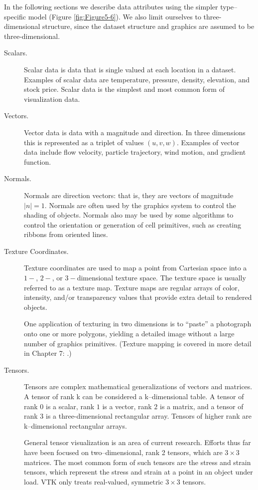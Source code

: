 In the following sections we describe data attributes using the simpler type--specific model (Figure \ref{fig:Figure5-6}). We also limit ourselves to three-dimensional structure, since the dataset structure and graphics are assumed to be three-dimensional.

\begin{description}

\item[Scalars.] Scalar data is data that is single valued at each location in a dataset. Examples of scalar data are temperature, pressure, density, elevation, and stock price. Scalar data is the simplest and most common form of visualization data.

\item[Vectors.] Vector data is data with a magnitude and direction. In three dimensions this is represented as a triplet of values $(u, v, w)$. Examples of vector data include flow velocity, particle trajectory, wind motion, and gradient function.

\item[Normals.] Normals are direction vectors: that is, they are vectors of magnitude $|n|=1$. Normals are often used by the graphics system to control the shading of objects. Normals also may be used by some algorithms to control the orientation or generation of cell primitives, such as creating ribbons from oriented lines.

\item[Texture Coordinates.] Texture coordinates are used to map a point from Cartesian space into a $1-$, $2-$, or $3-$dimensional texture space. The texture space is usually referred to as a texture map. Texture maps are regular arrays of color, intensity, and/or transparency values that provide extra detail to rendered objects.

One application of texturing in two dimensions is to ``paste'' a photograph onto one or more polygons, yielding a detailed image without a large number of graphics primitives. (Texture mapping is covered in more detail in Chapter 7:  .)

\item[Tensors.] Tensors are complex mathematical generalizations of vectors and matrices. A tensor of rank k can be considered a k--dimensional table. A tensor of rank $0$ is a scalar, rank $1$ is a vector, rank $2$ is a matrix, and a tensor of rank $3$ is a three-dimensional rectangular array. Tensors of higher rank are k--dimensional rectangular arrays.

General tensor visualization is an area of current research. Efforts thus far have been focused on two--dimensional, rank 2 tensors, which are $3 \times 3$ matrices. The most common form of such tensors are the stress and strain tensors, which represent the stress and strain at a point in an object under load. VTK only treats real-valued, symmetric $3 \times 3$ tensors.

\end{description}
